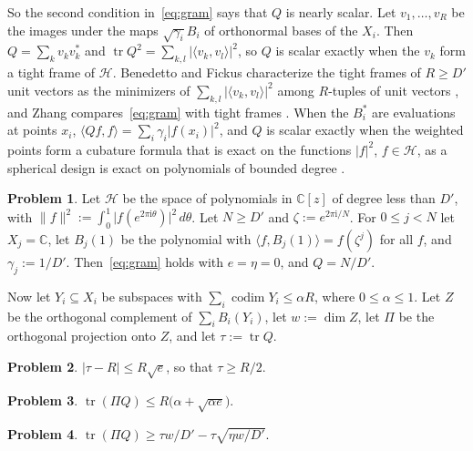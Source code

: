 \documentclass[reqno]{amsart}
\theoremstyle{definition}
\newtheorem{problem}{Problem}[section]
\theoremstyle{plain}
\newcommand{\C}{\mathbb{C}}
\newcommand{\Hc}{\mathcal{H}}
\newcommand{\ii}{\mathrm{i}}
\newcommand{\codim}{\operatorname{codim}}
\newcommand{\tr}{\operatorname{tr}}
\begin{document}
So the second condition in~\eqref{eq:gram} says that \(Q\) is nearly scalar.  Let \(v_1, \dots, v_R\) be the images under the maps \(\sqrt{\gamma_i} B_i\) of orthonormal bases of the \(X_i\).  Then \(Q = \sum_k v_k v_k^*\) and \(\tr Q^2 = \sum_{k, l} \lvert\langle v_k, v_l \rangle\rvert^2\), so \(Q\) is scalar exactly when the \(v_k\) form a tight frame of \(\Hc\).  Benedetto and Fickus characterize the tight frames of \(R \ge D'\) unit vectors as the minimizers of \(\sum_{k,l} \lvert\langle v_k, v_l \rangle\rvert^2\) among \(R\)-tuples of unit vectors \cite{BF}, and Zhang compares~\eqref{eq:gram} with tight frames \cite[\S4.4]{Zh}.  When the \(B_i^*\) are evaluations at points \(x_i\), \(\langle Q f, f \rangle = \sum_i \gamma_i \lvert f(x_i) \rvert^2\), and \(Q\) is scalar exactly when the weighted points form a cubature formula that is exact on the functions \(\lvert f \rvert^2\), \(f \in \Hc\), as a spherical design is exact on polynomials of bounded degree \cite{DGS}.

\begin{problem}\label{pr:roots}
Let \(\Hc\) be the space of polynomials in \(\C[z]\) of degree less than \(D'\), with \(\lVert f \rVert^2 := \int_0^1 \lvert f(e^{2\pi\ii\theta}) \rvert^2 \, d\theta\).  Let \(N \ge D'\) and \(\zeta := e^{2\pi\ii/N}\).  For \(0 \le j < N\) let \(X_j = \C\), let \(B_j(1)\) be the polynomial with \(\langle f, B_j(1) \rangle = f(\zeta^j)\) for all \(f\), and \(\gamma_j := 1/D'\).  Then~\eqref{eq:gram} holds with \(e = \eta = 0\), and \(Q = N/D'\).
\end{problem}

Now let \(Y_i \subseteq X_i\) be subspaces with \(\sum_i \codim Y_i \le \alpha R\), where \(0 \le \alpha \le 1\).  Let \(Z\) be the orthogonal complement of \(\sum_i B_i(Y_i)\), let \(w := \dim Z\), let \(\Pi\) be the orthogonal projection onto \(Z\), and let \(\tau := \tr Q\).

\begin{problem}\label{pr:trace-R}
\(\lvert \tau - R \rvert \le R\sqrt e\), so that \(\tau \ge R/2\).
\end{problem}

\begin{problem}\label{pr:trace-up}
\(\tr(\Pi Q) \le R\bigl(\alpha + \sqrt{\alpha e}\bigr)\).
\end{problem}

\begin{problem}\label{pr:trace-low}
\(\tr(\Pi Q) \ge \tau w/D' - \tau\sqrt{\eta w/D'}\).
\end{problem}
\end{document}
